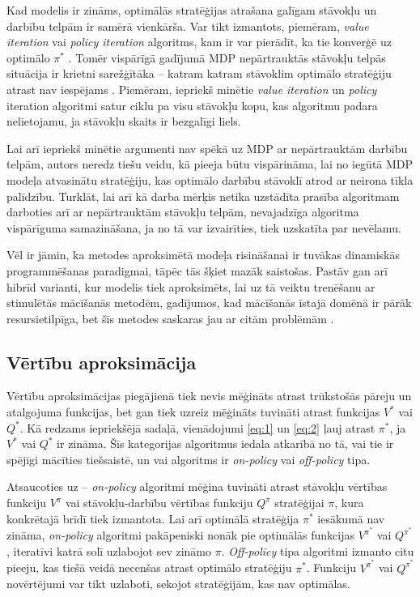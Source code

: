 \documentclass{ludis} %
\begin{document}
Kad modelis ir zināms, optimālās stratēģijas atrašana galīgam stāvokļu un
darbību telpām ir samērā vienkārša. Var tikt izmantots, piemēram, \textit{value
  iteration} vai \textit{policy iteration} algoritms, kam ir var pierādīt, ka
tie konverģē uz optimālo $\pi^*$ \autocite{Barto}. Tomēr vispārīgā gadījumā MDP
nepārtrauktās stāvokļu telpās situācija ir krietni sarežģītāka -- katram katram
stāvoklim optimālo stratēģiju atrast nav iespējams \autocite{Otterlo}. Piemēram,
iepriekš minētie \textit{value iteration} un \textit{policy} iteration algoritmi
satur ciklu pa visu stāvokļu kopu, kas algoritmu padara nelietojamu, ja stāvokļu
skaits ir bezgalīgi liels.


Lai arī iepriekš minētie argumenti nav spēkā uz MDP ar nepārtrauktām darbību
telpām, autors neredz tiešu veidu, kā pieeja būtu vispārināma, lai no iegūtā MDP
modeļa atvasinātu stratēģiju, kas optimālo darbību stāvoklī atrod ar neirona
tīkla palīdzību.
Turklāt, lai arī kā darba mērķis netika uzstādīta prasība algoritmam darboties
arī ar nepārtrauktām stāvokļu telpām, nevajadzīga algoritma vispārīguma
samazināšana, ja no tā var izvairīties, tiek uzskatīta par nevēlamu.

Vēl ir jāmin, ka metodes aproksimētā modeļa risināšanai ir tuvākas dinamiskās
programmēšanas paradigmai, tāpēc tās šķiet mazāk saistošas. Pastāv gan arī
hibrīd varianti, kur modelis tiek aproksimēts, lai uz tā veiktu trenēšanu ar
stimulētās mācīšanās metodēm, gadījumos, kad mācīšanās īstajā domēnā ir pārāk
resursietilpīga, bet šīs metodes saskaras jau ar citām problēmām
\autocite{Hasselt2012}.

\subsection{Vērtību aproksimācija}
Vērtību aproksimācijas piegājienā tiek nevis mēģināts atrast trūkstošās pāreju
un atalgojuma funkcijas, bet gan tiek uzreiz mēģināts tuvināti atrast funkcijas
$V^*$ vai $Q^*$. Kā redzams iepriekšējā sadaļā, vienādojumi \eqref{eq:1} un
\eqref{eq:2} ļauj atrast $\pi^*$, ja $V^*$ vai $Q^*$ ir zināma. Šīs kategorijas
algoritmus iedala atkarībā no tā, vai tie ir spējīgi mācīties tiešsaistē, un vai
algoritms ir \textit{on-policy} vai \textit{off-policy} tipa.

Atsaucoties uz \autocite{Hasselt2012} -- \textit{on-policy} algoritmi mēģina
tuvināti atrast stāvokļu vērtības funkciju $V^\pi$ vai stāvokļu-darbību vērtības
funkciju $Q^\pi$ stratēģijai $\pi$, kura konkrētajā brīdī tiek izmantota. Lai
arī optimālā stratēģija $\pi^*$ iesākumā nav zināma, \textit{on-policy}
algoritmi pakāpeniski nonāk pie optimālās funkcijas $V^{\pi^*}$ vai $Q^{\pi^*}$,
iteratīvi katrā solī uzlabojot sev zināmo $\pi$. \textit{Off-policy} tipa
algoritmi izmanto citu pieeju, kas tiešā veidā necenšas atrast optimālo
stratēģiju $\pi^*$. Funkciju $V^{\pi^*}$ vai $Q^{\pi^*}$ novērtējumi var tikt
uzlaboti, sekojot stratēģijām, kas nav optimālas.
\end{document}
